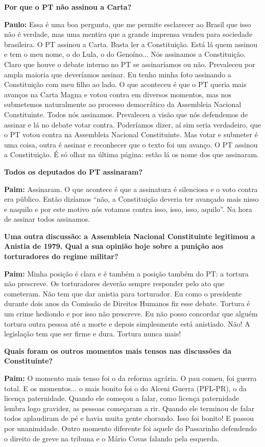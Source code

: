 \textbf{Por que o PT não assinou a Carta?}

\textbf{Paulo:} Essa é uma boa pergunta, que me permite esclarecer ao
Brasil que isso não é verdade, mas uma mentira que a grande imprensa
vendeu para sociedade brasileira. O PT assinou a Carta. Basta ler a
Constituição. Está lá quem assinou e tem o meu nome, o do Lula, o do
Genoíno... Nós assinamos a Constituição. Claro que houve o debate
interno no PT se assinaríamos ou não. Prevaleceu por ampla maioria que
deveríamos assinar. Eu tenho minha foto assinando a Constituição com meu
filho ao lado. O que aconteceu é que o PT queria mais avanços na Carta
Magna e votou contra em diversos momentos, mas nos submetemos
naturalmente ao processo democrático da Assembleia Nacional
Constituinte. Todos nós assinamos. Prevaleceu a visão que nós defendemos
de assinar e lá no debate votar contra. Poderíamos dizer, aí sim seria
verdadeiro, que o PT votou contra na Assembleia Nacional Constituinte.
Mas votar e submeter é uma coisa, outra é assinar e reconhecer que o
texto foi um avanço. O PT assinou a Constituição. É só olhar na última
página: estão lá os nome dos que assinaram.

\textbf{Todos os deputados do PT assinaram?}

\textbf{Paim:} Assinaram. O que acontece é que a assinatura é silenciosa
e o voto contra era público. Então dizíamos ``não, a Constituição
deveria ter avançado mais nisso e naquilo e por este motivo nós votamos
contra isso, isso, isso, aquilo''. Na hora de assinar todos assinamos.

\textbf{Uma outra discussão: a Assembleia Nacional Constituinte
legitimou a Anistia de 1979. Qual a sua opinião hoje sobre a punição aos
torturadores do regime militar?}

\textbf{Paim:} Minha posição é clara e é também a posição também do PT:
a tortura não prescreve. Os torturadores deverão sempre responder pelo
ato que cometeram. Não tem que dar anistia para torturador. Eu como o
presidente durante dois anos da Comissão de Direitos Humanos fiz esse
debate. Tortura é um crime hediondo e por isso não prescreve. Eu não
posso concordar que alguém tortura outra pessoa até a morte e depois
simplesmente está anistiado. Não! A legislação tem que ser firme e dura.
Tortura nunca mais!

\textbf{Quais foram os outros momentos mais tensos nas discussões da
Constituinte?}

\textbf{Paim:} O momento mais tenso foi o da reforma agrária. O pau
comeu, foi guerra total. E os momentos... o mais bonito foi o do Alceni
Guerra (PFL-PR), o da licença paternidade. Quando ele começou a falar,
como licença paternidade lembra logo gravidez, as pessoas começaram a
rir. Quando ele terminou de falar todos aplaudiram de pé e havia muita
gente chorando. Isso foi bonito! E passou por unanimidade. Outro momento
diferente foi aquele do Passarinho defendendo o direito de greve na
tribuna e o Mário Covas falando pela esquerda.

